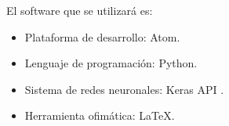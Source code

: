 El software que se utilizará es:
\begin{itemize}
	\item Plataforma de desarrollo: Atom.
	\item Lenguaje de programación: Python.
	\item Sistema de redes neuronales: Keras API \cite{Keras2015}.
	\item Herramienta ofimática: \LaTeX.
\end{itemize}
